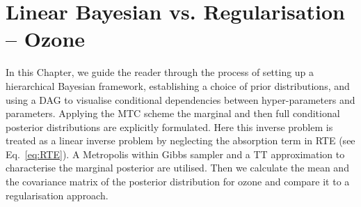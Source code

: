\chapter{Linear Bayesian vs. Regularisation -- Ozone}
\label{ch:LinVsReg}
\thispagestyle{empty}

In this Chapter, we guide the reader through the process of setting up a hierarchical Bayesian framework, establishing a choice of prior distributions, and using a DAG to visualise conditional dependencies between hyper-parameters and parameters.
Applying the MTC scheme the marginal and then full conditional posterior distributions are explicitly formulated.
Here this inverse problem is treated as a linear inverse problem by neglecting the absorption term in RTE (see Eq.~\ref{eq:RTE}).
A Metropolis within Gibbs sampler and a TT approximation to characterise the marginal posterior are utilised.
Then we calculate the mean and the covariance matrix of the posterior distribution for ozone and compare it to a regularisation approach.



